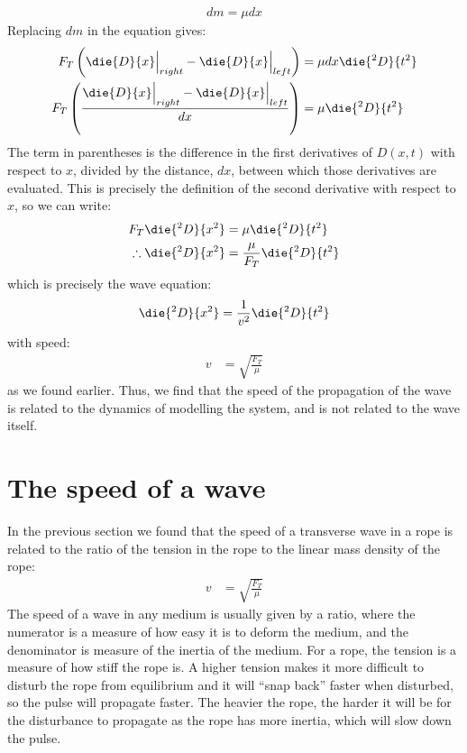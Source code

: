 \begin{align*}
dm = \mu dx
\end{align*}
Replacing $dm$ in the equation gives:
\begin{align*}
F_T\left(\die{D}{x}\Bigr|_{right} - \die{D}{x}\Bigr|_{left}\right) &= \mu dx \die{^2D}{t^2}\\
F_T\left(\frac{\die{D}{x}\Bigr|_{right} - \die{D}{x}\Bigr|_{left}}{dx}\right) &= \mu \die{^2D}{t^2}
\end{align*}
The term in parentheses is the difference in the first derivatives of $D(x,t)$ with respect to $x$, divided by the distance, $dx$, between which those derivatives are evaluated. This is precisely the definition of the second derivative with respect to $x$, so we can write:
\begin{align*}
F_T \die{^2D}{x^2} &= \mu \die{^2D}{t^2}\\
\therefore \die{^2D}{x^2} &= \frac{\mu}{F_T} \die{^2D}{t^2}\\
\end{align*}
which is precisely the wave equation:
\begin{align*}
\die{^2D}{x^2} &= \frac{1}{v^2} \die{^2D}{t^2}\\
\end{align*}
with speed:
\begin{align*}
v&= \sqrt{\frac{F_T}{\mu}}
\end{align*}
as we found earlier. Thus, we find that the speed of the propagation of the wave is related to the dynamics of modelling the system, and is not related to the wave itself. 

\section{The speed of a wave}
In the previous section we found that the speed of a transverse wave in a rope is related to the ratio of the tension in the rope to the linear mass density of the rope:
\begin{align*}
v&= \sqrt{\frac{F_T}{\mu}}
\end{align*}
The speed of a wave in any medium is usually given by a ratio, where the numerator is a measure of how easy it is to deform the medium, and the denominator is measure of the inertia of the medium. For a rope, the tension is a measure of how stiff the rope is. A higher tension makes it more difficult to disturb the rope from equilibrium and it will ``snap back'' faster when disturbed, so the pulse will propagate faster. The heavier the rope, the harder it will be for the disturbance to propagate as the rope has more inertia, which will slow down the pulse.

